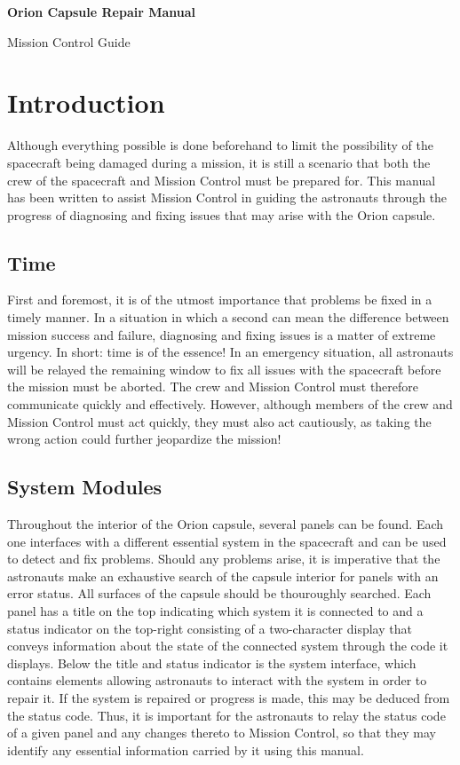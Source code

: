 \documentclass[12pt]{article}
\begin{document}
\begin{titlepage}
 \thispagestyle{empty}
 \centering
 \rmfamily
 {\Huge\bfseries Orion Capsule Repair Manual\par}
 \vspace{1cm}
 {\Large Mission Control Guide}
 \vfill
\end{titlepage}

\section*{Introduction}

Although everything possible is done beforehand to limit the possibility of the spacecraft being damaged during a mission, it is still a scenario that both the crew of the spacecraft and Mission Control must be prepared for. This manual has been written to assist Mission Control in guiding the astronauts through the progress of diagnosing and fixing issues that may arise with the Orion capsule.

\subsection*{Time}

First and foremost, it is of the utmost importance that problems be fixed in a timely manner. In a situation in which a second can mean the difference between mission success and failure, diagnosing and fixing issues is a matter of extreme urgency. In short: time is of the essence! In an emergency situation, all astronauts will be relayed the remaining window to fix all issues with the spacecraft before the mission must be aborted. The crew and Mission Control must therefore communicate quickly and effectively. However, although members of the crew and Mission Control must act quickly, they must also act cautiously, as taking the wrong action could further jeopardize the mission!

\subsection*{System Modules}

Throughout the interior of the Orion capsule, several panels can be found. Each one interfaces with a different essential system in the spacecraft and can be used to detect and fix problems. Should any problems arise, it is imperative that the astronauts make an exhaustive search of the capsule interior for panels with an error status. All surfaces of the capsule should be thouroughly searched. Each panel has a title on the top indicating which system it is connected to and a status indicator on the top-right consisting of a two-character display that conveys information about the state of the connected system through the code it displays. Below the title and status indicator is the system interface, which contains elements allowing astronauts to interact with the system in order to repair it. If the system is repaired or progress is made, this may be deduced from the status code. Thus, it is important for the astronauts to relay the status code of a given panel and any changes thereto to Mission Control, so that they may identify any essential information carried by it using this manual.
\end{document}
